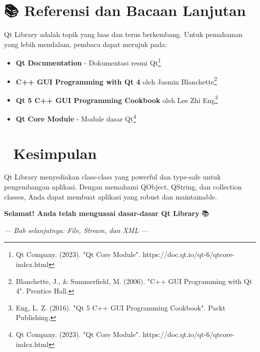 \section{📚 Referensi dan Bacaan Lanjutan}

Qt Library adalah topik yang luas dan terus berkembang. Untuk pemahaman yang lebih mendalam, pembaca dapat merujuk pada:

\begin{itemize}
\item \textbf{Qt Documentation} - Dokumentasi resmi Qt\footnote{Qt Company. (2023). "Qt Core Module". https://doc.qt.io/qt-6/qtcore-index.html}
\item \textbf{C++ GUI Programming with Qt 4} oleh Jasmin Blanchette\footnote{Blanchette, J., \& Summerfield, M. (2006). "C++ GUI Programming with Qt 4". Prentice Hall.}
\item \textbf{Qt 5 C++ GUI Programming Cookbook} oleh Lee Zhi Eng\footnote{Eng, L. Z. (2016). "Qt 5 C++ GUI Programming Cookbook". Packt Publishing.}
\item \textbf{Qt Core Module} - Module dasar Qt\footnote{Qt Company. (2023). "Qt Core Module". https://doc.qt.io/qt-6/qtcore-index.html}
\end{itemize}

\section{🎉 Kesimpulan}

Qt Library menyediakan class-class yang powerful dan type-safe untuk pengembangan aplikasi. Dengan memahami QObject, QString, dan collection classes, Anda dapat membuat aplikasi yang robust dan maintainable.

\begin{center}
\textbf{Selamat! Anda telah menguasai dasar-dasar Qt Library} 📚
\end{center}

\vspace{1cm}

\begin{center}
\textit{--- Bab selanjutnya: File, Stream, dan XML ---}
\end{center}
